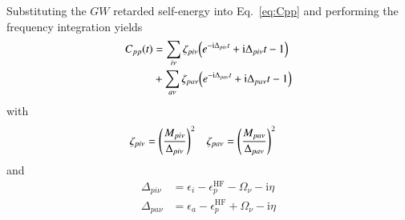 \documentclass[aip,jcp,reprint,noshowkeys,superscriptaddress]{revtex4-2}
\newcommand{\HF}{\text{HF}}
\newcommand{\eps}{\epsilon}
\newcommand{\Om}{\Omega}
\newcommand{\ii}{\mathrm{i}}
\begin{document}
Substituting the $GW$ retarded self-energy into Eq.~\eqref{eq:Cpp} and performing the frequency integration yields
\begin{equation} 
\begin{split} 
	C_{pp}(t) 
	& = \sum_{i\nu} \zeta_{pi\nu} \qty( e^{-\ii \Delta_{pi\nu} t} + \ii \Delta_{pi\nu} t - 1 )
	\\
	& + \sum_{a\nu} \zeta_{pa\nu} \qty( e^{-\ii \Delta_{pa\nu} t} + \ii \Delta_{pa\nu} t - 1 )
\end{split}
\end{equation}
with 
\begin{align}
	\zeta_{pi\nu} & = \qty(\frac{M_{pi\nu}}{\Delta_{pi\nu}})^2
	&
	\zeta_{pa\nu} & = \qty(\frac{M_{pa\nu}}{\Delta_{pa\nu}})^2
\end{align}
and
\begin{subequations}
\begin{align}
	\Delta_{pi\nu} & = \eps_i - \eps_p^\HF - \Om_\nu - \ii \eta
	\\
	\Delta_{pa\nu} & = \eps_a - \eps_p^\HF + \Om_\nu - \ii \eta
\end{align}
\end{subequations}
\end{document}
